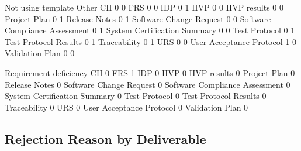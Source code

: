 \documentclass{article}
\begin{document}
\begin{Schunk}
\begin{Soutput}
                                 Not using template Other
  CII                                             0     0
  FRS                                             0     0
  IDP                                             0     1
  IIVP                                            0     0
  IIVP results                                    0     0
  Project Plan                                    0     1
  Release Notes                                   0     1
  Software Change Request                         0     0
  Software Compliance Assessment                  0     1
  System Certification Summary                    0     0
  Test Protocol                                   0     1
  Test Protocol Results                           0     1
  Traceability                                    0     1
  URS                                             0     0
  User Acceptance Protocol                        1     0
  Validation Plan                                 0     0
                                
                                 Requirement deficiency
  CII                                                 0
  FRS                                                 1
  IDP                                                 0
  IIVP                                                0
  IIVP results                                        0
  Project Plan                                        0
  Release Notes                                       0
  Software Change Request                             0
  Software Compliance Assessment                      0
  System Certification Summary                        0
  Test Protocol                                       0
  Test Protocol Results                               0
  Traceability                                        0
  URS                                                 0
  User Acceptance Protocol                            0
  Validation Plan                                     0
\end{Soutput}
\end{Schunk}


\subsection{Rejection Reason by Deliverable}
\end{document}
